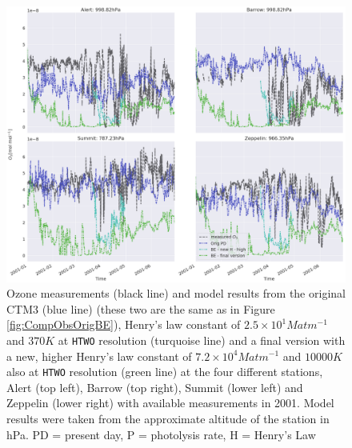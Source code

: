 \begin{figure}[ht]
    \centering
    \includegraphics[width=\linewidth]{Chapter6_Results/images/ozone_stationComp_2001/ozone_2001_step4.png}
    \caption{Ozone measurements (black line) and model results from the original CTM3 (blue line) (these two are the same as in Figure \ref{fig:CompObsOrigBE}), Henry's law constant of $2.5\times10^{1} M atm ^{-1}$ and $370 K$ at \texttt{HTWO} resolution (turquoise line) and a final version with a new, higher Henry's law constant of $7.2\times10^{4} M atm ^{-1}$ and $10 000 K$ also at \texttt{HTWO} resolution (green line) at the four different stations, Alert (top left), Barrow (top right), Summit (lower left) and Zeppelin (lower right) with available measurements in 2001. Model results were taken from the approximate altitude of the station in hPa. PD = present day, P = photolysis rate, H = Henry's Law}
    \label{fig:ozone_2001_step4}
\end{figure}